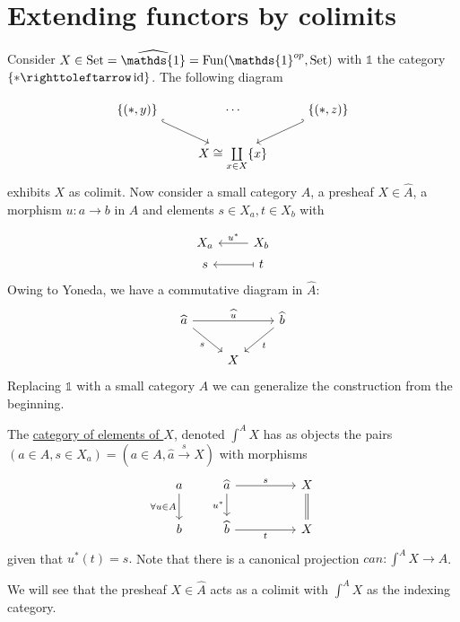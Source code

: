 \setcounter{section}{4}
\section{Extending functors by colimits}

Consider $X\in\Set = \widehat{\mathds{1}}=\Fun(\mathds{1}^{op},\Set)$ with $\mathds{1}$  the category $\{\ast\righttoleftarrow \id\}$. The following diagram

\[\begin{tikzcd}
\{(\ast,y)\} \arrow[rd, hook] & \cdots                      & \{(\ast,z)\} \arrow[ld, hook'] \\
                 & X\cong\coprod\limits_{x\in X}\{x\} &                 
\end{tikzcd}\]
exhibits $X$ as colimit. Now consider a small category $A$, a presheaf $X\in \widehat{A}$, a morphism $u\colon a \to b$ in $A$ and elements $s\in X_a, t\in X_b$ with

\[
    \begin{tikzcd}[row sep= 2pt]
    X_a & X_b \arrow[l, "u^*"'] \\
    s   & t \arrow[l, maps to] 
    \end{tikzcd}
\]
Owing to Yoneda, we have a commutative diagram in $\widehat{A}$:
\[
\begin{tikzcd}
\widehat{a} \arrow[rd, "s"'] \arrow[rr, "\widehat{u}"] &   & \widehat{b} \arrow[ld, "t"] \\
                                               & X &                        
\end{tikzcd}
\]
Replacing $\mathds{1}$ with a small category $A$ we can generalize the construction from the beginning.
\begin{defi}
    The \underline{category of elements of $X$}, denoted $\int^A X$ has as objects the pairs $(a\in A, s\in X_a)=(a\in A, \widehat{a}\xrightarrow{s} X)$ with morphisms
    \[
        \begin{tikzcd}
        a \arrow[d, "\forall u\in A"'] & \widehat{a} \arrow[rr, "s"] \arrow[d, "u^*"'] && X \arrow[d, Rightarrow, no head] \\
        b                              & \widehat{b} \arrow[rr, "t"']                      && X                               
        \end{tikzcd}
    \]
    given that $u^*(t)=s.$ Note that there is a canonical projection $can\colon \int^A X \to A$.
\end{defi}
We will see that the presheaf $X\in \widehat{A}$ acts as a colimit with $\int^A X$ as the indexing category.

